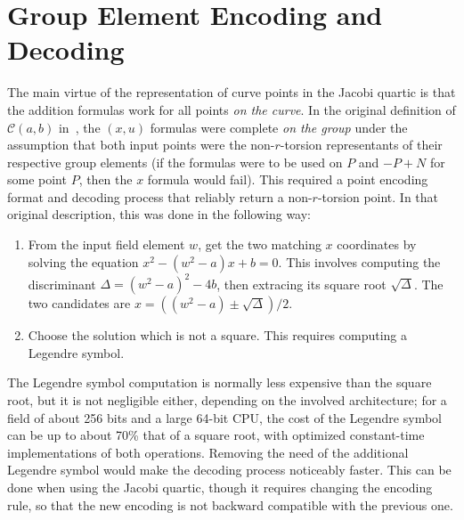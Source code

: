 \documentclass{llncs}
\newcommand{\cC}{\mathcal{C}}
\begin{document}

\section{Group Element Encoding and Decoding}\label{sec:codec}

The main virtue of the representation of curve points in the Jacobi
quartic is that the addition formulas work for all points \emph{on the
curve}. In the original definition of $\cC(a,b)$ in~\cite{Por2020-5},
the $(x,u)$ formulas were complete \emph{on the group} under the
assumption that both input points were the non-$r$-torsion representants
of their respective group elements (if the formulas were to be used on
$P$ and $-P+N$ for some point $P$, then the $x$ formula would fail).
This required a point encoding format and decoding process that reliably
return a non-$r$-torsion point. In that original description, this was
done in the following way:
\begin{enumerate}

    \item From the input field element $w$, get the two matching $x$
    coordinates by solving the equation $x^2 - (w^2 - a)x + b = 0$.
    This involves computing the discriminant $\Delta = (w^2-a)^2 - 4b$,
    then extracing its square root $\sqrt{\Delta}$. The two candidates
    are $x = ((w^2 - a) \pm \sqrt{\Delta})/2$.

    \item Choose the solution which is not a square. This requires
    computing a Legendre symbol.

\end{enumerate}
The Legendre symbol computation is normally less expensive than the
square root, but it is not negligible either, depending on the involved
architecture; for a field of about 256 bits and a large 64-bit CPU, the
cost of the Legendre symbol can be up to about 70\% that of a square
root, with optimized constant-time implementations of both operations.
Removing the need of the additional Legendre symbol would make the
decoding process noticeably faster. This can be done when using the
Jacobi quartic, though it requires changing the encoding rule, so that
the new encoding is not backward compatible with the previous one.
\end{document}
